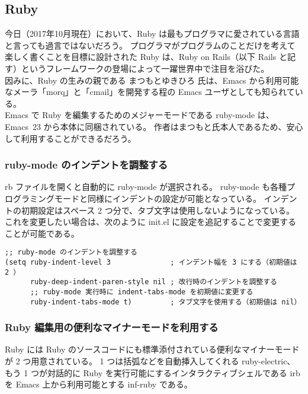 \subsection{Ruby}
今日（2017年10月現在）において、Ruby は最もプログラマに愛されている言語と言っても過言ではないだろう。
プログラマがプログラムのことだけを考えて楽しく書くことを目標に設計された Ruby は、Ruby on Rails（以下 Rails と記す）というフレームワークの登場によって一躍世界中で注目を浴びた。\\

因みに、Ruby の生みの親である まつもとゆきひろ 氏は、Emacs から利用可能なメーラ「morq」と「cmail」を開発する程の Emacs ユーザとしても知られている。\\

Emacs で Ruby を編集するためのメジャーモードである ruby-mode は、Emacs~23 から本体に同梱されている。
作者はまつもと氏本人であるため、安心して利用することができるだろう。
\subsubsection{ruby-mode のインデントを調整する}
rb ファイルを開くと自動的に ruby-mode が選択される。
ruby-mode も各種プログラミングモードと同様にインデントの設定が可能となっている。
インデントの初期設定はスペース 2 つ分で、タブ文字は使用しないようになっている。
これを変更したい場合は、次のように init.el に設定を追記することで変更することが可能である。
\begin{mdframed}[roundcorner=0.50zw,leftmargin=3.00zw,rightmargin=3.00zw,skipabove=0.40zw,skipbelow=0.40zw,innertopmargin=4.00pt,innerbottommargin=4.00pt,innerleftmargin=5.00pt,innerrightmargin=5.00pt,linecolor=gray!020,linewidth=0.50pt,backgroundcolor=gray!20]
\begin{verbatim}
;; ruby-mode のインデントを調整する
(setq ruby-indent-level 3              ; インデント幅を 3 にする（初期値は 2 ）
      ruby-deep-indent-paren-style nil ; 改行時のインデントを調整する
      ;; ruby-mode 実行時に indent-tabs-mode を初期値に変更する
      ruby-indent-tabs-mode t)         ; タブ文字を使用する（初期値は nil）
\end{verbatim}
\end{mdframed}
\subsubsection{Ruby 編集用の便利なマイナーモードを利用する}
Ruby には Ruby のソースコードにも標準添付されている便利なマイナーモードが 2 つ用意されている。
1 つは括弧などを自動挿入してくれる ruby-electric、もう 1 つが対話的に Ruby を実行可能にするインタラクティブシェルである irb を Emacs 上から利用可能とする inf-ruby である。\\

